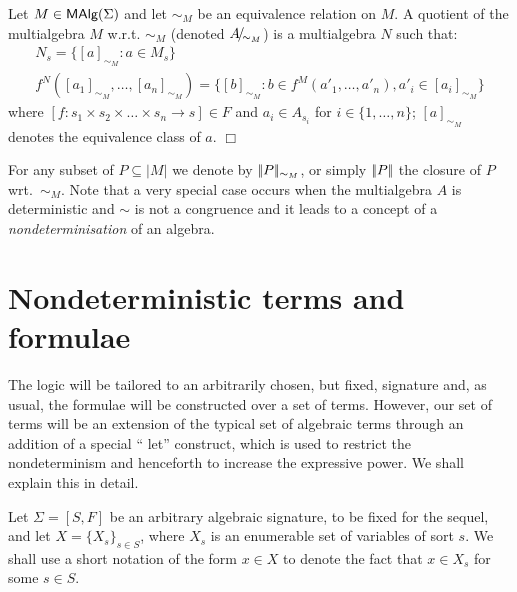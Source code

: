 \begin{Definition}
Let $M \in \mbox{\rm\sf MAlg}(\Sigma)$ and let $\sim_M$ be an equivalence relation
on $M$. A quotient of the multialgebra $M$ w.r.t. $\sim_M$ (denoted
$A\!{\textstyle /}\!_{\sim_M}$) is a multialgebra $N$ such that:
\[
\begin{array}{l}
N_s = \{ [a]_{\sim_M} : a \in M_s \} \\
f^N([a_1]_{\sim_M},\ldots,[a_n]_{\sim_M}) = 
\{ [b]_{\sim_M} : b \in f^M(a'_1,\ldots,a'_n), a'_i \in [a_i]_{\sim_M} \}
\end{array}
\]
where $[f : s_1 \times s_2 \times \ldots \times s_n \rightarrow s] \in F$
and $a_i \in A_{s_i}$ for $i \in \{1,\ldots,n\}$; $[a]_{\sim_M}$ denotes
the equivalence class of $a$.
\hfill$\Box$
\end{Definition}
%
For any subset of $P \subseteq |M|$ we denote by $|\!|P|\!|_{\sim_M}$,
or simply $|\!|P|\!|$ the closure of $P$ wrt.\ $\sim_M$. Note that a
very special case occurs when the multialgebra $A$ is deterministic
and $\sim$ is not a congruence and it leads to a concept of a {\em
nondeterminisation} of an algebra.

\section{Nondeterministic terms and formulae}

The logic will be tailored to an arbitrarily chosen, but fixed,
signature and, as usual, the formulae will be constructed over a set
of terms. However, our set of terms will be an extension of the
typical set of algebraic terms through an addition of a special ``{\sf
let}'' construct, which is used to restrict the nondeterminism and
henceforth to increase the expressive power.  We shall explain this in
detail.

Let $\Sigma = [S,F]$ be an arbitrary algebraic signature, to be fixed
for the sequel, and let $X=\{X_s\}_{s\in S}$, where $X_s$ is an 
enumerable set of variables of sort $s$. We shall use a short
notation of the form $x\in X$ to denote the fact that $x\in X_s$ for
some $s\in S$.

